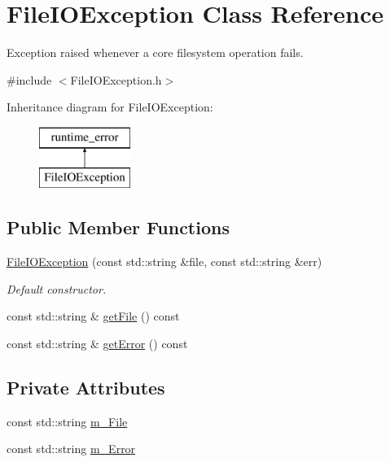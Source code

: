 \hypertarget{class_file_i_o_exception}{}\section{File\+I\+O\+Exception Class Reference}
\label{class_file_i_o_exception}


Exception raised whenever a core filesystem operation fails.  




{\ttfamily \#include $<$File\+I\+O\+Exception.\+h$>$}

Inheritance diagram for File\+I\+O\+Exception\+:\begin{figure}[H]
\begin{center}
\leavevmode
\includegraphics[height=2.000000cm]{class_file_i_o_exception}
\end{center}
\end{figure}
\subsection*{Public Member Functions}
\begin{DoxyCompactItemize}
\item 
\hyperlink{class_file_i_o_exception_a50807e035fd588fdba672b626e7e950a}{File\+I\+O\+Exception} (const std\+::string \&file, const std\+::string \&err)
\begin{DoxyCompactList}\small\item\em Default constructor. \end{DoxyCompactList}\item 
const std\+::string \& \hyperlink{class_file_i_o_exception_afb4ef7ef699df309bb14cc97cb3f52ed}{get\+File} () const 
\item 
const std\+::string \& \hyperlink{class_file_i_o_exception_a8230811beaad6b8352f972f616f51d09}{get\+Error} () const 
\end{DoxyCompactItemize}
\subsection*{Private Attributes}
\begin{DoxyCompactItemize}
\item 
const std\+::string \hyperlink{class_file_i_o_exception_aabe82501c1620dae2236fe2c877c36ed}{m\+\_\+\+File}
\item 
const std\+::string \hyperlink{class_file_i_o_exception_a2f1715571b72f01da492e6d2429f7a29}{m\+\_\+\+Error}
\end{DoxyCompactItemize}


